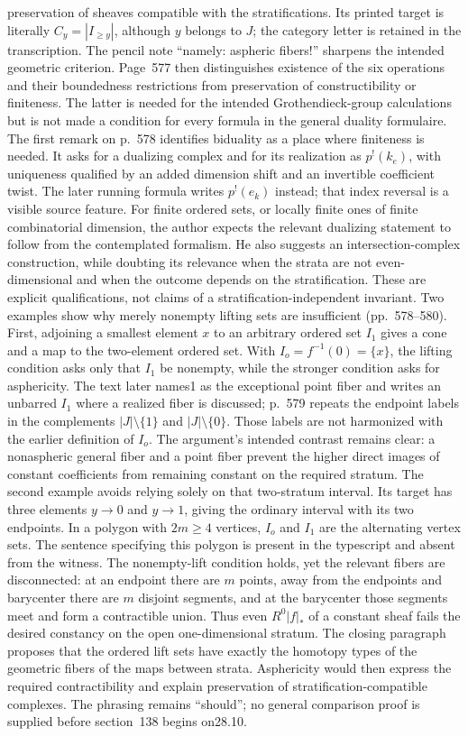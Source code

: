 \documentclass[10pt,oneside]{book}
\begin{document}
preservation of sheaves compatible with the stratifications. Its printed target is literally $C_y=|I_{\geq y}|$, although $y$ belongs to $J$; the category letter is retained in the transcription. The pencil note ``namely: aspheric fibers!'' sharpens the intended geometric criterion. Page~577 then distinguishes existence of the six operations and their boundedness restrictions from preservation of constructibility or finiteness. The latter is needed for the intended Grothendieck-group calculations but is not made a condition for every formula in the general duality formulaire. The first remark on p.~578 identifies biduality as a place where finiteness is needed. It asks for a dualizing complex and for its realization as $p^!(k_e)$, with uniqueness qualified by an added dimension shift and an invertible coefficient twist. The later running formula writes $p^!(e_k)$ instead; that index reversal is a visible source feature. For finite ordered sets, or locally finite ones of finite combinatorial dimension, the author expects the relevant dualizing statement to follow from the contemplated formalism. He also suggests an intersection-complex construction, while doubting its relevance when the strata are not even-dimensional and when the outcome depends on the stratification. These are explicit qualifications, not claims of a stratification-independent invariant. Two examples show why merely nonempty lifting sets are insufficient (pp.~578--580). First, adjoining a smallest element $x$ to an arbitrary ordered set $I_1$ gives a cone and a map to the two-element ordered set. With $I_o=f^{-1}(0)=\{x\}$, the lifting condition asks only that $I_1$ be nonempty, while the stronger condition asks for asphericity. The text later names1 as the exceptional point fiber and writes an unbarred $I_1$ where a realized fiber is discussed; p.~579 repeats the endpoint labels in the complements $|J|\setminus\{1\}$ and $|J|\setminus\{0\}$. Those labels are not harmonized with the earlier definition of $I_o$. The argument's intended contrast remains clear: a nonaspheric general fiber and a point fiber prevent the higher direct images of constant coefficients from remaining constant on the required stratum. The second example avoids relying solely on that two-stratum interval. Its target has three elements $y\to0$ and $y\to1$, giving the ordinary interval with its two endpoints. In a polygon with $2m\geq4$ vertices, $I_o$ and $I_1$ are the alternating vertex sets. The sentence specifying this polygon is present in the typescript and absent from the witness. The nonempty-lift condition holds, yet the relevant fibers are disconnected: at an endpoint there are $m$ points, away from the endpoints and barycenter there are $m$ disjoint segments, and at the barycenter those segments meet and form a contractible union. Thus even $R^0|f|_*$ of a constant sheaf fails the desired constancy on the open one-dimensional stratum. The closing paragraph proposes that the ordered lift sets have exactly the homotopy types of the geometric fibers of the maps between strata. Asphericity would then express the required contractibility and explain preservation of stratification-compatible complexes. The phrasing remains ``should''; no general comparison proof is supplied before section~138 begins on28.10.
\end{document}
